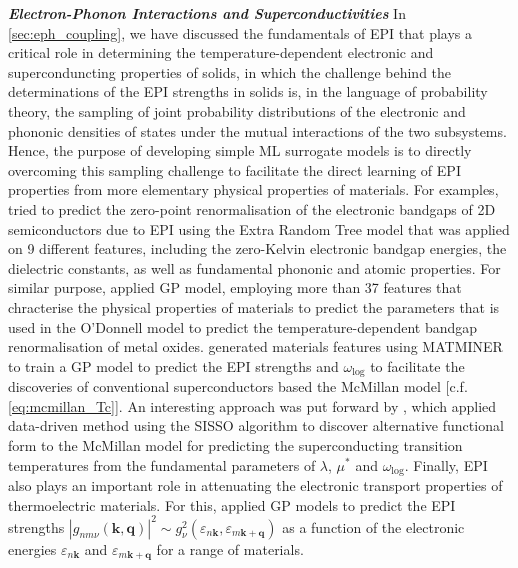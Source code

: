\textbf{\textit{Electron-Phonon Interactions and Superconductivities}} In \cref{sec:eph_coupling}, we have discussed the fundamentals of EPI that plays a critical role in determining the temperature-dependent electronic and superconduncting properties of solids, in which the challenge behind the determinations of the EPI strengths in solids is, in the language of probability theory, the sampling of joint probability distributions of the electronic and phononic densities of states under the mutual interactions of the two subsystems. Hence, the purpose of developing simple ML surrogate models is to directly overcoming this sampling challenge to facilitate the direct learning of EPI properties from more elementary physical properties of materials. For examples, \citet{haldar2024machine} tried to predict the zero-point renormalisation of the electronic bandgaps of 2D semiconductors due to EPI using the Extra Random Tree model that was applied on 9 different features, including the zero-Kelvin electronic bandgap energies, the dielectric constants, as well as fundamental phononic and atomic properties. For similar purpose, \citet{nandi2024machine} applied GP model,  employing more than 37 features that chracterise the physical properties of materials to predict the parameters that is used in the O'Donnell model to predict the temperature-dependent bandgap renormalisation of metal oxides. \citet{tran2023machine} generated materials features using MATMINER\cite{ward2018matminer} to train a GP model to predict the EPI strengths and $\omega_{\mathrm{log}}$  to facilitate the discoveries of conventional superconductors based the McMillan model [c.f. \cref{eq:mcmillan_Tc}]. An interesting approach was put forward by \citet{xie2019functional}, which applied data-driven method using the SISSO\cite{ouyang2018sisso} algorithm to discover alternative functional form to the McMillan model for predicting the superconducting transition temperatures from the fundamental parameters of $\lambda$, $\mu^{*}$ and $\omega_{\mathrm{log}}$. Finally, EPI also plays an important role in attenuating the electronic transport properties of thermoelectric materials. For this, \citet{wee2019quantification} applied GP models to predict the EPI strengths $\left\vert g_{nm\nu}(\bm{k},\bm{q}) \right\vert^2\sim g_\nu^2(\varepsilon_{n\bm{k}},\varepsilon_{m\bm{k}+\bm{q}})$ as a function of the electronic energies $\varepsilon_{n\bm{k}}$ and $\varepsilon_{m\bm{k}+\bm{q}}$ for a range of materials.

